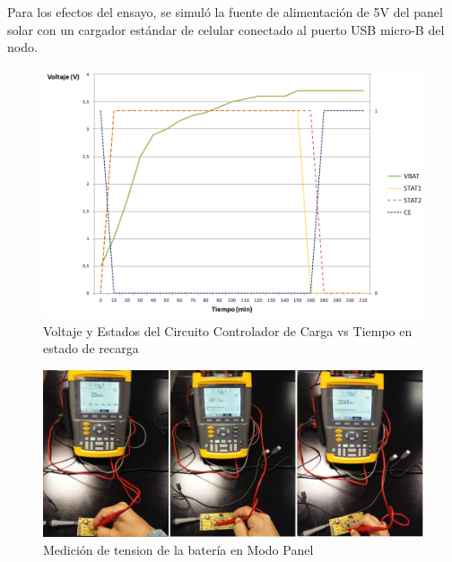 Para los efectos del ensayo, se simuló la fuente de alimentación de 5V del panel solar con un cargador estándar de celular conectado al puerto USB micro-B del nodo.
\begin{figure}[h!]
	\centering
    \includegraphics[width=1.2\textwidth]{./Figures/carga.png}
    	\caption{Voltaje y Estados del Circuito Controlador de Carga vs Tiempo en estado de recarga}
	\label{fig:carga}
\end{figure}
\begin{figure}[h!]
	\centering
    \includegraphics[width=1.2\textwidth]{./Figures/cargando.jpg}
    	\caption{Medición de tension de la batería en Modo Panel}
	\label{fig:curva}
\end{figure}



